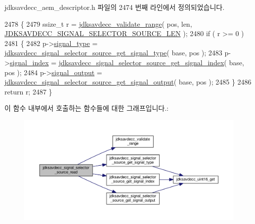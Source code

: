 jdksavdecc\+\_\+aem\+\_\+descriptor.\+h 파일의 2474 번째 라인에서 정의되었습니다.


\begin{DoxyCode}
2478 \{
2479     ssize\_t r = \hyperlink{group__util_ga9c02bdfe76c69163647c3196db7a73a1}{jdksavdecc\_validate\_range}( pos, len, 
      \hyperlink{group__signal__selector__source_ga70171d7a5ae8bc4f88d72d79f74d4c75}{JDKSAVDECC\_SIGNAL\_SELECTOR\_SOURCE\_LEN} );
2480     \textcolor{keywordflow}{if} ( r >= 0 )
2481     \{
2482         p->\hyperlink{structjdksavdecc__signal__selector__source_a248e60ef99d5ed1779989d1dd6b6dc5a}{signal\_type} = 
      \hyperlink{group__signal__selector__source_ga478548268358a64f614121179a50fb0f}{jdksavdecc\_signal\_selector\_source\_get\_signal\_type}( base, 
      pos );
2483         p->\hyperlink{structjdksavdecc__signal__selector__source_ae2e81a95ee9ad83f1fe22b6a1ee29075}{signal\_index} = 
      \hyperlink{group__signal__selector__source_ga6cbe5d2190536f8e2d16d509967d978d}{jdksavdecc\_signal\_selector\_source\_get\_signal\_index}( base,
       pos );
2484         p->\hyperlink{structjdksavdecc__signal__selector__source_ab4b91864e6fc335d7e86536d9f4461e4}{signal\_output} = 
      \hyperlink{group__signal__selector__source_gafe235e06df2853057bf1c0499ecf71b6}{jdksavdecc\_signal\_selector\_source\_get\_signal\_output}( 
      base, pos );
2485     \}
2486     \textcolor{keywordflow}{return} r;
2487 \}
\end{DoxyCode}


이 함수 내부에서 호출하는 함수들에 대한 그래프입니다.\+:
\nopagebreak
\begin{figure}[H]
\begin{center}
\leavevmode
\includegraphics[width=350pt]{group__signal__selector__source_gadc0af91873311828f147505865c522bc_cgraph}
\end{center}
\end{figure}


